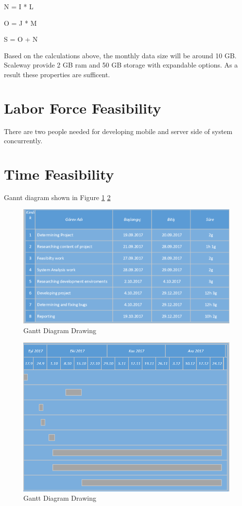 N = I * L

O = J * M

S = O + N

Based on the calculations above, the monthly data size will be around 10 GB. Scaleway provide 2 GB ram and 50 GB storage with expandable options. As a result these properties are sufficent.

\section{Labor Force Feasibility}
There are two people needed for developing mobile and server side of system concurrently.

\newpage
\section{Time Feasibility}
Gannt diagram shown in Figure \ref{fig:gantt1}
\ref{fig:gantt2}
\begin{figure}[!htbp]
\centering
\includegraphics[width=\textwidth]{projectChapters/images/gantt1.png}
\caption{Gantt Diagram Drawing}
\label{fig:gantt1}
\end{figure}
\begin{figure}[!htbp]
\centering
\includegraphics[width=\textwidth]{projectChapters/images/gantt2.png}
\caption{Gantt Diagram Drawing}
\label{fig:gantt2}
\end{figure}

